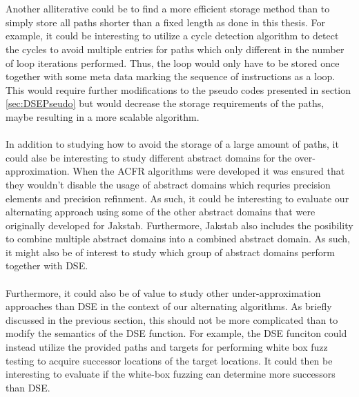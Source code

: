 \documentclass{kththesis}
\begin{document}
\\ \\
Another alliterative could be to find a more efficient storage method than to simply store all paths shorter than a fixed length as done in this thesis. For example, it could be interesting to utilize a cycle detection algorithm to detect the cycles
to avoid multiple entries for paths which only different in the number of loop iterations performed. Thus, the loop would only have to be stored once together with some meta data marking the sequence of instructions as a loop. This would require further modifications to the pseudo codes presented in section \ref{sec:DSEPseudo} but would decrease the storage requirements of the paths, maybe resulting in a more scalable algorithm.
\\ \\
In addition to studying how to avoid the storage of a large amount of paths, it could alse be interesting to study different abstract domains for the over-approximation. When the ACFR algorithms were developed it was ensured that they wouldn't disable the usage of abstract domains which requries precision elements and precision refinment. As such, it could be interesting to evaluate our alternating approach using some of the other abstract domains that were originally developed for Jakstab. Furthermore, Jakstab also includes the posibility to combine multiple abstract domains into a combined abstract domain. As such, it might also be of interest to study which group of abstract domains perform together with DSE.
\\ \\
Furthermore, it could also be of value to study other under-approximation approaches than DSE in the context of our alternating algorithms. As briefly discussed in the previous section, this should not be more complicated than to modify the semantics of the DSE function. For example, the DSE funciton could instead utilize the provided paths and targets for performing white box fuzz testing\cite{automatedFuzzing} to acquire successor locations of the target locations. It could then be interesting to evaluate if the white-box fuzzing can determine more successors than DSE.

\begin{otherlanguage}{australian}%
\printbibliography[heading=bibintoc]
\end{otherlanguage}
\end{document}
